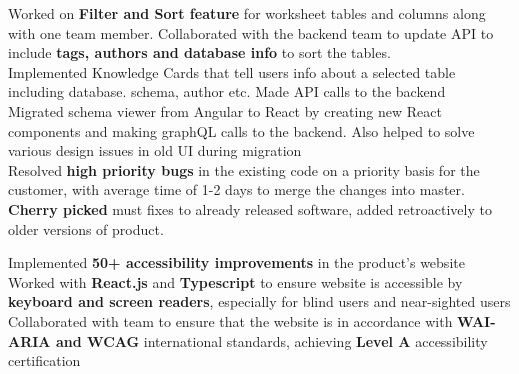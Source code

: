 \documentclass[]{Nikhil_Kadiyan_Resume}
\begin{document}
\pt Worked on \textbf{Filter and Sort feature} for worksheet tables and columns along with one team member. Collaborated with the backend team to update API to include \textbf{tags, authors and database info} to sort the tables.\\
\pt Implemented Knowledge Cards that tell users info about a selected table including database. schema, author etc. Made API calls to the backend\\
\pt Migrated schema viewer from Angular to React by creating new React components and making graphQL calls to the backend. Also helped to solve various design issues in old UI during migration\\
\pt Resolved \textbf{high priority bugs} in the existing code on a priority basis for the customer, with average time of 1-2 days to merge the changes into master. \textbf{Cherry picked} must fixes to already released software, added retroactively to older versions of product.\\
\sectionsep

\pt Implemented \textbf{50+ accessibility improvements} in the product's website\\
\pt Worked with \textbf{React.js} and \textbf{Typescript} to ensure website is accessible by \textbf{keyboard and screen readers}, especially for blind users and near-sighted users\\
\pt Collaborated with team to ensure that the website is in accordance with \textbf{WAI-ARIA and WCAG} international standards, achieving \textbf{Level A}  accessibility certification\\
\sectionsep


\end{document}
